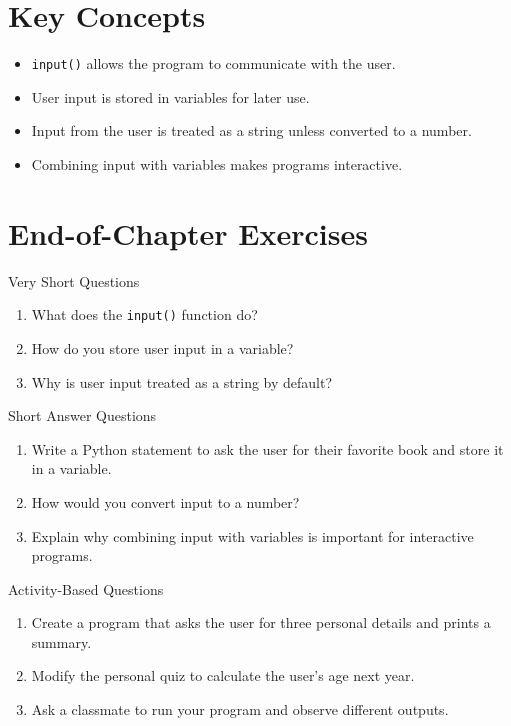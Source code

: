 \section{Key Concepts}

\begin{itemize}
    \item \texttt{input()} allows the program to communicate with the user.
    \item User input is stored in variables for later use.
    \item Input from the user is treated as a string unless converted to a number.
    \item Combining input with variables makes programs interactive.
\end{itemize}

\section{End-of-Chapter Exercises}

\begin{exercise}{Very Short Questions}
\begin{enumerate}
    \item What does the \texttt{input()} function do?
    \item How do you store user input in a variable?
    \item Why is user input treated as a string by default?
\end{enumerate}
\end{exercise}

\begin{exercise}{Short Answer Questions}
\begin{enumerate}
    \item Write a Python statement to ask the user for their favorite book and store it in a variable.
    \item How would you convert input to a number?
    \item Explain why combining input with variables is important for interactive programs.
\end{enumerate}
\end{exercise}

\begin{exercise}{Activity-Based Questions}
\begin{enumerate}
    \item Create a program that asks the user for three personal details and prints a summary.
    \item Modify the personal quiz to calculate the user’s age next year.
    \item Ask a classmate to run your program and observe different outputs.
\end{enumerate}
\end{exercise}

